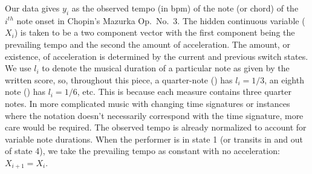 \documentclass[12pt]{article}
\begin{document}
Our data gives $y_i$ as the observed tempo (in bpm) of the note (or
chord) of the $i^{th}$ note onset in Chopin's Mazurka Op.\ No.\ 3. The
hidden continuous variable ($X_i$) is 
taken to be a two component vector with the first component being the
prevailing tempo and the second the amount of acceleration. The amount, or
existence, of acceleration is determined by the current and previous
switch states. We use $l_i$ to denote the musical duration of
a particular note as given by the written score, so, throughout this piece, a quarter-note (\quarternote) has $l_i=1/3$, an
eighth note (\eighthnote) has $l_i=1/6$, etc. This is because each
measure contains three quarter notes. In more complicated
music with changing time signatures or instances where the notation
doesn't necessarily correspond with the time signature, more care
would be required. The observed tempo is already normalized to account
for variable note durations. When the performer is in state 1 (or
transits in and out of state 4), we take the prevailing tempo as
constant with no acceleration: $X_{i+1} = X_i$. 
\end{document}
